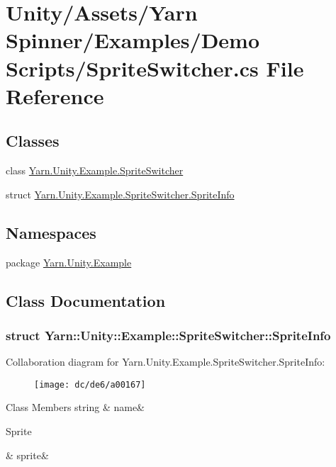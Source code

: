 \hypertarget{a00114}{\section{Unity/\-Assets/\-Yarn Spinner/\-Examples/\-Demo Scripts/\-Sprite\-Switcher.cs File Reference}
\label{a00114}
}
\subsection*{Classes}
\begin{DoxyCompactItemize}
\item 
class \hyperlink{a00073}{Yarn.\-Unity.\-Example.\-Sprite\-Switcher}
\item 
struct \hyperlink{a00073_dd/dae/a00163}{Yarn.\-Unity.\-Example.\-Sprite\-Switcher.\-Sprite\-Info}
\end{DoxyCompactItemize}
\subsection*{Namespaces}
\begin{DoxyCompactItemize}
\item 
package \hyperlink{a00153}{Yarn.\-Unity.\-Example}
\end{DoxyCompactItemize}


\subsection{Class Documentation}
\label{dd/dae/a00163}
\hypertarget{a00073_dd/dae/a00163}{}
\subsubsection{struct Yarn\-:\-:Unity\-:\-:Example\-:\-:Sprite\-Switcher\-:\-:Sprite\-Info}


Collaboration diagram for Yarn.\-Unity.\-Example.\-Sprite\-Switcher.\-Sprite\-Info\-:
\nopagebreak
\begin{figure}[H]
\begin{center}
\leavevmode
\texttt{[image: dc/de6/a00167]}
\end{center}
\end{figure}
\begin{DoxyFields}{Class Members}
\hypertarget{a00073_a3f5bca2fff413dfe075c1fcf7e58369c}{string}\label{a00073_a3f5bca2fff413dfe075c1fcf7e58369c}
&
name&
\\
\hline

\hypertarget{a00073_adc58df011dc2841837b6cf775b372061}{Sprite}\label{a00073_adc58df011dc2841837b6cf775b372061}
&
sprite&
\\
\hline

\end{DoxyFields}
